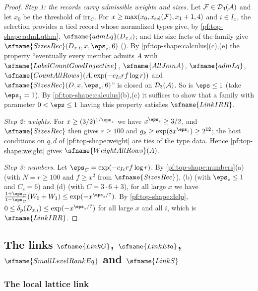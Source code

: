 \begin{proof}
\emph{Step 1: the records carry admissible weights and sizes.} Let $\mathcal{F}\in\mathcal{D}_3(\mathcal A)$ and let $x_0$
be the threshold of $\mathrm{irr}_C$. For $x\ge\max(x_0,x_{\rm sel}(\mathcal{F}),x_1+1,4)$ and $i\in I_x$, the selection
provides a tied record whose normalized types give, by \cref{pf:top-shape:admLqthm}, $\sfname{admLq}(D_{x,i})$; and
the size facts of the family give $\sfname{SizesRec}(D_{x,i},x,\eps_z,6)$
(). By \cref{pf:top-shape:calculus}(c),(e) the property ``eventually
every member admits $A$ with $\sfname{LabelCountGoodInjective}$, $\sfname{AllJoinA}$, $\sfname{admLq}$,
$\sfname{CountAllRows}(A,\exp(-c_{Ic}rf\log r))$ and $\sfname{SizesRec}(D,x,\eps_z,6)$'' is closed on
$\mathcal{D}_3(\mathcal A)$. So is $\eps\le1$ (take $\eps_1=1$). By \cref{pf:top-shape:calculus}(b),(c) it suffices to
show that a family with parameter $0<\eps\le1$ having this property satisfies $\sfname{LinkIRR}$.

\emph{Step 2: weights.} For $x\ge(3/2)^{1/\eps_z}$ we have $x^{\eps_z}\ge3/2$, and $\sfname{SizesRec}$ then gives
$r\ge100$ and $g_k\ge\exp(8x^{\eps_z})\ge2^{12}$; the host conditions on $q,d$ of \cref{pf:top-shape:weight} are ties of
the type data. Hence \cref{pf:top-shape:weight} gives $\sfname{WeightAllRows}(A)$.

\emph{Step 3: numbers.} Let $\eps_C=\exp(-c_{Ic}rf\log r)$. By \cref{pf:top-shape:numbers}(a) (with $N=r\ge100$
and $f\ge x^2$ from $\sfname{SizesRec}$), (b) (with $\eps_z\le1$ and $C_s=6$) and (d) (with $C=3\cdot6+3$), for all
large $x$ we have $\frac{1+\eps_C}{1-\eps_C}(W_0+W_1)\le\exp(-x^{\eps_z/7})$. By \cref{pf:top-shape:delp},
$0\le\delta_p(D_{x,i})\le\exp(-x^{\eps_z/7})$ for all large $x$ and all $i$, which is $\sfname{LinkIRR}$.
\end{proof}

\subsection{The links \texorpdfstring{$\sfname{LinkG}$, $\sfname{LinkEta}$, $\sfname{SmallLevelRankEq}$ and
$\sfname{LinkS}$}{LinkG, LinkEta, SmallLevelRankEq and LinkS}}\label{sec:pf:top-shape:links}

\subsubsection*{The local lattice link}

